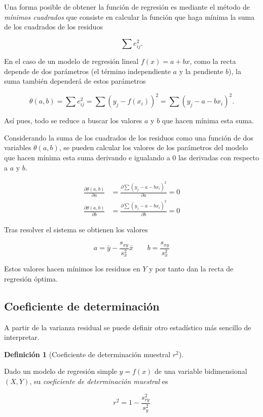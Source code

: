 \documentclass[
  a4paper,
]{scrreport}
\theoremstyle{plain}
\theoremstyle{definition}
\newtheorem{definition}{Definición}[chapter]
\theoremstyle{definition}
\theoremstyle{remark}
\begin{document}
Una forma posible de obtener la función de regresión es mediante el
método de \emph{mínimos cuadrados} que consiste en calcular la función
que haga mínima la suma de los cuadrados de los residuos

\[\sum e_{ij}^2.\]

En el caso de un modelo de regresión lineal \(f(x) = a + bx\), como la
recta depende de dos parámetros (el término independiente \(a\) y la
pendiente \(b\)), la suma también dependerá de estos parámetros

\[\theta(a,b) = \sum e_{ij}^2 =\sum (y_j - f(x_i))^2 =\sum (y_j-a-bx_i)^2.\]

Así pues, todo se reduce a buscar los valores \(a\) y \(b\) que hacen
mínima esta suma.

Considerando la suma de los cuadrados de los residuos como una función
de dos variables \(\theta(a,b)\), se pueden calcular los valores de los
parámetros del modelo que hacen mínima esta suma derivando e igualando a
0 las derivadas con respecto a \(a\) y \(b\).

\begin{align*}
\frac{\partial \theta(a,b)}{\partial a} &=  \frac{\partial \sum (y_j-a-bx_i)^2 }{\partial a} =0\\
\frac{\partial \theta(a,b)}{\partial b} &=  \frac{\partial \sum (y_j-a-bx_i)^2 }{\partial b} =0
\end{align*}

Tras resolver el sistema se obtienen los valores

\[
a= \bar y - \frac{s_{xy}}{s_x^2}\bar x \qquad b=\frac{s_{xy}}{s_x^2}
\]

Estos valores hacen mínimos los residuos en \(Y\) y por tanto dan la
recta de regresión óptima.

\subsection{Coeficiente de
determinación}\label{coeficiente-de-determinaciuxf3n}

A partir de la varianza residual se puede definir otro estadístico más
sencillo de interpretar.

\begin{definition}[Coeficiente de determinación muestral
\(r^2\)]\protect\hypertarget{def-coeficiente-determinacion}{}\label{def-coeficiente-determinacion}

Dado un modelo de regresión simple \(y=f(x)\) de una variable
bidimensional \((X,Y)\), su \emph{coeficiente de determinación muestral}
es

\[r^2 = 1- \frac{s_{ry}^2}{s_y^2}\]

\end{definition}
\end{document}
